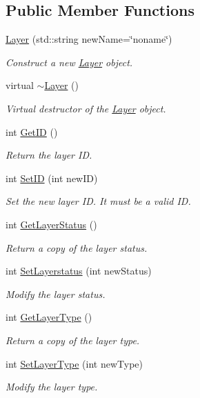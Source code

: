 \subsection*{Public Member Functions}
\begin{DoxyCompactItemize}
\item 
\hyperlink{classlad_1_1_layer_a1a7d572812da1f17c292a0cfb977d4fe}{Layer} (std\+::string new\+Name=\char`\"{}noname\char`\"{})
\begin{DoxyCompactList}\small\item\em Construct a new \hyperlink{classlad_1_1_layer}{Layer} object. \end{DoxyCompactList}\item 
virtual \hyperlink{classlad_1_1_layer_abb04ca2570deb63ee685c3e8f74d872e}{$\sim$\+Layer} ()
\begin{DoxyCompactList}\small\item\em Virtual destructor of the \hyperlink{classlad_1_1_layer}{Layer} object. \end{DoxyCompactList}\item 
int \hyperlink{classlad_1_1_layer_a10a5e4b4cf9618129d57c960805b7607}{Get\+ID} ()
\begin{DoxyCompactList}\small\item\em Return the layer ID. \end{DoxyCompactList}\item 
int \hyperlink{classlad_1_1_layer_ae2d1e4d8d656967f9367555f6d960b7d}{Set\+ID} (int new\+ID)
\begin{DoxyCompactList}\small\item\em Set the new layer ID. It must be a valid ID. \end{DoxyCompactList}\item 
int \hyperlink{classlad_1_1_layer_a8223ec6cf99de0275118e20faa011bc9}{Get\+Layer\+Status} ()
\begin{DoxyCompactList}\small\item\em Return a copy of the layer status. \end{DoxyCompactList}\item 
int \hyperlink{classlad_1_1_layer_a7572fd2665a35c074b2f341ce8f73030}{Set\+Layerstatus} (int new\+Status)
\begin{DoxyCompactList}\small\item\em Modify the layer status. \end{DoxyCompactList}\item 
int \hyperlink{classlad_1_1_layer_aedd28090728135c4ae8a445f0d016b2c}{Get\+Layer\+Type} ()
\begin{DoxyCompactList}\small\item\em Return a copy of the layer type. \end{DoxyCompactList}\item 
int \hyperlink{classlad_1_1_layer_a178643063c5fb55f4010579731d3025b}{Set\+Layer\+Type} (int new\+Type)
\begin{DoxyCompactList}\small\item\em Modify the layer type. \end{DoxyCompactList}\end{DoxyCompactItemize}
